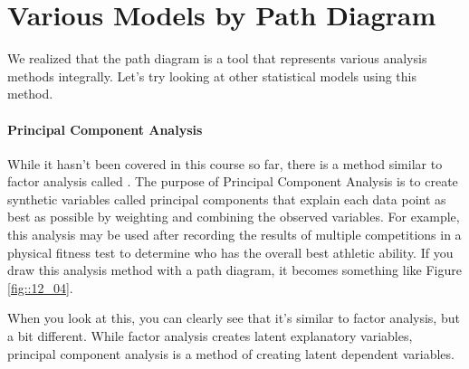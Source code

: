 \documentclass{ltjsbook}
\begin{document}
\section{Various Models by Path Diagram}

We realized that the path diagram is a tool that represents various analysis methods integrally. Let's try looking at other statistical models using this method.

\paragraph{Principal Component Analysis} While it hasn't been covered in this course so far, there is a method similar to factor analysis called . The purpose of Principal Component Analysis is to create synthetic variables called principal components that explain each data point as best as possible by weighting and combining the observed variables. For example, this analysis may be used after recording the results of multiple competitions in a physical fitness test to determine who has the overall best athletic ability. If you draw this analysis method with a path diagram, it becomes something like Figure \ref{fig::12_04}.



When you look at this, you can clearly see that it's similar to factor analysis, but a bit different. While factor analysis creates latent explanatory variables, principal component analysis is a method of creating latent dependent variables.
\end{document}
